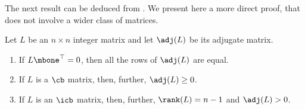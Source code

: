 The next result can be deduced from \cite[Theorem~7.6]{opv}. We
present here a more direct proof, that does not involve a wider class
of matrices. 

\begin{proposition}\label{adj(L)rowconstant}
Let $L$ be an $n\times n$ integer matrix and let $\adj(L)$ be its
adjugate matrix.\leavevmode
\begin{enumerate}[label=\textup{(}\alph*\textup{)}]
\item If $L\mbone^{\top}=0$, then all the rows of $\adj(L)$ are
  equal.
\item If $L$ is a $\cb$ matrix, then, further, $\adj(L)\geq 0$.
\item If $L$ is an $\icb$ matrix, then, further, $\rank(L)=n-1$
  and $\adj(L)>0$.
\end{enumerate}
\end{proposition}
